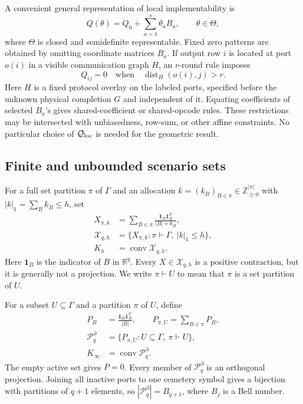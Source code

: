 \documentclass[journal,10pt]{IEEEtran}
\theoremstyle{definition}
\theoremstyle{remark}
\newcommand{\R}{\mathbb R}
\newcommand{\one}{\mathbf 1}
\newcommand{\conv}{\operatorname{conv}}
\newcommand{\dist}{\operatorname{dist}}
\newcommand{\cX}{\mathcal X}
\newcommand{\cP}{\mathcal P}
\newcommand{\cQ}{\mathcal Q}
\begin{document}
A convenient general representation of local implementability is
\begin{equation}
  Q(\theta)=Q_0+\sum_{a=1}^s\theta_aB_a,
  \qquad \theta\in\Theta,
  \label{eq:affine-rule}
\end{equation}
where $\Theta$ is closed and semidefinite representable.  Fixed zero patterns
are obtained by omitting coordinate matrices $B_a$.  If output row $i$ is
located at port $o(i)$ in a visible communication graph $H$, an $r$-round rule
imposes
\[
  Q_{ij}=0\quad\text{when}\quad \dist_H(o(i),j)>r.
\]
Here $H$ is a fixed protocol overlay on the labeled ports, specified before
the unknown physical completion $G$ and independent of it.  Equating
coefficients of selected $B_a$'s gives shared-coefficient or
shared-opcode rules.  These restrictions may be intersected with unbiasedness,
row-sum, or other affine constraints.  No particular choice of
$\cQ_{\rm loc}$ is needed for the geometric result.

\subsection{Finite and unbounded scenario sets}

For a full set partition $\pi$ of $\Gamma$ and an allocation
$k=(k_B)_{B\in\pi}\in\mathbb Z_{\geq0}^{|\pi|}$ with
$|k|_1=\sum_Bk_B\leq h$, set
\begin{equation}
\begin{aligned}
 X_{\pi,k}&=\sum_{B\in\pi}
       \frac{\one_B\one_B^T}{|B|+k_B},\\
 \cX_{q,h}&=\{X_{\pi,k}:\pi\vdash\Gamma,\ |k|_1\leq h\},\\
 K_h&=\conv\cX_{q,h}.
\end{aligned}
  \label{eq:finite-scenarios}
\end{equation}
Here $\one_B$ is the indicator of $B$ in $\R^q$.  Every
$X\in\cX_{q,h}$ is a positive contraction, but it is generally not a
projection.  We write $\pi\vdash U$ to mean that $\pi$ is a set partition of
$U$.

For a subset $U\subseteq\Gamma$ and a partition $\pi$ of $U$, define
\begin{equation}
\begin{aligned}
 P_B&=\frac{\one_B\one_B^T}{|B|},\qquad
 P_{\pi,U}=\sum_{B\in\pi}P_B,\\
 \cP_q^\partial
   &=\{P_{\pi,U}:U\subseteq\Gamma,\ \pi\vdash U\},\\
 K_\infty&=\conv\cP_q^\partial .
\end{aligned}
  \label{eq:partial-scenarios}
\end{equation}
The empty active set gives $P=0$.  Every member of $\cP_q^\partial$ is an
orthogonal projection.  Joining all inactive ports to one cemetery symbol
gives a bijection with partitions of $q+1$ elements, so
$|\cP_q^\partial|=B_{q+1}$, where $B_j$ is a Bell number.
\end{document}
